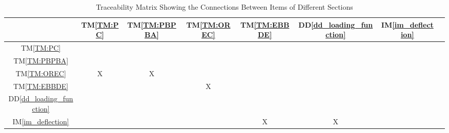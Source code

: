 \documentclass[12pt]{article}
\newcommand{\ddref}[1]{DD\ref{#1}}
\newcommand{\tref}[1]{TM\ref{#1}}
\newcommand{\iref}[1]{IM\ref{#1}}
\begin{document}
\begin{table}[h!]
    \centering
    \begin{tabular}{|c|c|c|c|c|c|c|c|}
        \hline
                                    & \tref{TM:PC} & \tref{TM:PBPBA} & \tref{TM:OREC} & \tref{TM:EBBDE} & \ddref{dd_loading_function} & \iref{im_deflection} \\ \hline
        \tref{TM:PC}                &              &                 &                &                 &                             &                      \\ \hline
        \tref{TM:PBPBA}             &              &                 &                &                 &                             &                      \\ \hline
        \tref{TM:OREC}              & X            & X               &                &                 &                             &                      \\ \hline
        \tref{TM:EBBDE}             &              &                 & X              &                 &                             &                      \\ \hline
        \ddref{dd_loading_function} &              &                 &                &                 &                             &                      \\ \hline
        \iref{im_deflection}        &              &                 &                & X               & X                           &                      \\ \hline
    \end{tabular}
    \caption{Traceability Matrix Showing the Connections Between Items of Different Sections}
    \label{Table:trace}
\end{table}
\end{document}

